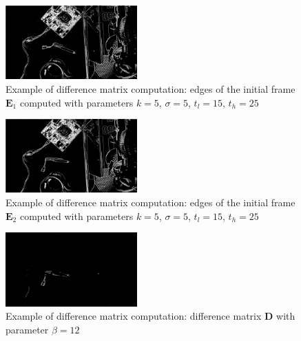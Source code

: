 \documentclass[journal]{IEEEtran}
\begin{document}
\begin{figure}[H]
	\centering
	\includegraphics[width=0.45\textwidth]{desk_edges_1.jpg}
	\caption{Example of difference matrix computation: edges of the initial frame $\boldsymbol{E}_1$ computed with parameters $k = 5$, $\sigma = 5$, $t_l = 15$, $t_h = 25$}
    \label{desk-1-edges}
\end{figure}
\begin{figure}[H]
	\centering
	\includegraphics[width=0.45\textwidth]{desk_edges_2.jpg}
	\caption{Example of difference matrix computation: edges of the initial frame $\boldsymbol{E}_2$ computed with parameters $k = 5$, $\sigma = 5$, $t_l = 15$, $t_h = 25$}
    \label{desk-2-edges}
\end{figure}
\begin{figure}[H]
	\centering
	\includegraphics[width=0.45\textwidth]{desk_difference.jpg}
	\caption{Example of difference matrix computation: difference matrix $\boldsymbol{D}$ with parameter $\beta = 12$}
    \label{desk-difference}
\end{figure}
\end{document}
